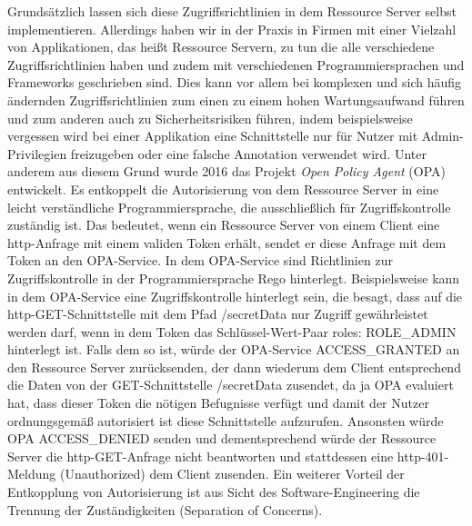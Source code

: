Grundsätzlich lassen sich diese Zugriffsrichtlinien in dem Ressource Server selbst implementieren. Allerdings haben wir in der Praxis in Firmen mit einer Vielzahl von Applikationen, das heißt Ressource Servern, zu tun die alle verschiedene Zugriffsrichtlinien haben und zudem mit verschiedenen Programmiersprachen und Frameworks geschrieben sind. Dies kann vor allem bei komplexen und sich häufig ändernden Zugriffsrichtlinien zum einen zu einem hohen Wartungsaufwand führen und zum anderen auch zu Sicherheitsrisiken führen, indem beispielsweise vergessen wird bei einer Applikation eine Schnittstelle nur für Nutzer mit Admin-Privilegien freizugeben oder eine falsche Annotation verwendet wird. 
Unter anderem aus diesem Grund wurde 2016 das Projekt \emph{Open Policy Agent} (OPA) entwickelt. Es entkoppelt die Autorisierung von dem Ressource Server in eine leicht verständliche Programmiersprache, die ausschließlich für Zugriffskontrolle zuständig ist. Das bedeutet, wenn ein Ressource Server von einem Client eine http-Anfrage mit einem validen Token erhält, sendet er diese Anfrage mit dem Token an den OPA-Service. In dem OPA-Service sind Richtlinien zur Zugriffskontrolle in der Programmiersprache Rego hinterlegt. Beispielsweise kann in dem OPA-Service eine Zugriffskontrolle hinterlegt sein, die besagt, dass auf die http-GET-Schnittstelle mit dem Pfad /secretData nur Zugriff gewährleistet werden darf, wenn in dem Token das Schlüssel-Wert-Paar roles: ROLE\_ADMIN hinterlegt ist. Falls dem so ist, würde der OPA-Service ACCESS\_GRANTED an den Ressource Server zurücksenden, der dann wiederum dem Client entsprechend die Daten von der GET-Schnittstelle /secretData zusendet, da ja OPA evaluiert hat, dass dieser Token die nötigen Befugnisse verfügt und damit der Nutzer ordnungsgemäß autorisiert ist diese Schnittstelle aufzurufen. Ansonsten würde \ac{OPA} ACCESS\_DENIED senden und dementsprechend würde der Ressource Server die http-GET-Anfrage nicht beantworten und stattdessen eine http-401-Meldung (Unauthorized) dem Client zusenden. Ein weiterer Vorteil der Entkopplung von Autorisierung ist aus Sicht des Software-Engineering die Trennung der Zuständigkeiten (Separation of Concerns). 


%
%
